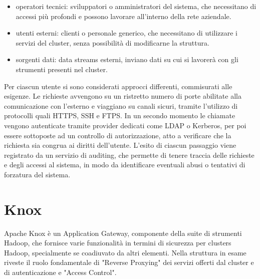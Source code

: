 \begin{itemize}
	\item operatori tecnici: sviluppatori o amministratori del sistema, che necessitano di accessi più profondi e possono lavorare all'interno della rete aziendale.
	\item utenti esterni: clienti o personale generico, che necessitano di utilizzare i servizi del cluster, senza possibilità di modificarne la struttura.
	\item sorgenti dati: data streams esterni, inviano dati su cui si lavorerà con gli strumenti presenti nel cluster.
\end{itemize}
Per ciascun utente si sono considerati approcci differenti, commisurati alle esigenze. 
Le richieste avvengono su un ristretto numero di porte abilitate alla comunicazione con l'esterno e viaggiano su canali sicuri, tramite l'utilizzo di protocolli quali HTTPS, SSH e FTPS.
\newline
In un secondo momento le chiamate vengono autenticate tramite provider dedicati come LDAP o Kerberos, per poi essere sottoposte ad un controllo di autorizzazione, atto a verificare che la richiesta sia congrua ai diritti dell'utente.
\newline
L'esito di ciascun passaggio viene registrato da un servizio di auditing, che permette di tenere traccia delle richieste e degli accessi al sistema, in modo da identificare eventuali abusi o tentativi di forzatura del sistema.

\pagebreak

\section{Knox}

Apache Knox è un Application Gateway, componente della suite di strumenti Hadoop, che fornisce varie funzionalità in termini di sicurezza per clusters Hadoop, specialmente se coadiuvato da altri elementi.
\newline
Nella struttura in esame riveste il ruolo fondamentale di "Reverse Proxying" dei servizi offerti dal cluster e di autenticazione e "Access Control".
